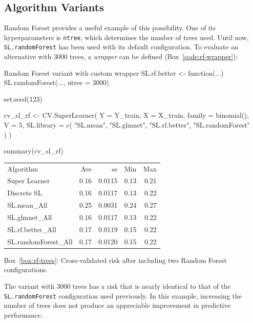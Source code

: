 \documentclass[12pt]{article}
\newcommand{\routputcaption}[2]{%
    \par\smallskip
    \begin{center}
        Box~\ref{#1}: #2
    \end{center}
}
\begin{document}
\subsection{Algorithm Variants}

Random Forest provides a useful example of this possibility. One of its hyperparameters is \texttt{ntree}, which determines the number of trees used. Until now, \texttt{SL.randomForest} has been used with its default configuration. To evaluate an alternative with 3000 trees, a \textit{wrapper} can be defined (Box~\ref{code:rf-wrapper}):

\begin{rcode}[label={code:rf-wrapper}]{Random Forest variant with custom wrapper}
	SL.rf.better <- function(...) {
		SL.randomForest(..., ntree = 3000)
	}
	
	set.seed(123)
	
	cv_sl_rf <- CV.SuperLearner(
	Y = Y_train, X = X_train,
	family = binomial(),
	V = 5,
	SL.library = c(
	"SL.mean",
	"SL.glmnet",
	"SL.rf.better",
	"SL.randomForest"
	)
	)
	
	summary(cv_sl_rf)
\end{rcode}

\begin{routputboxref}[label={box:rf-trees}]
	\ttfamily
	\centering
	\begin{tabular}{lrrrr}
		Algorithm & Ave & se & Min & Max \\
		Super Learner & 0.16 & 0.0115 & 0.13 & 0.21 \\
		Discrete SL & 0.16 & 0.0117 & 0.13 & 0.22 \\
		SL.mean\_All & 0.25 & 0.0031 & 0.24 & 0.27 \\
		SL.glmnet\_All & 0.16 & 0.0117 & 0.13 & 0.22 \\
		SL.rf.better\_All & 0.17 & 0.0119 & 0.15 & 0.22 \\
		SL.randomForest\_All & 0.17 & 0.0120 & 0.15 & 0.22 \\
	\end{tabular}
\end{routputboxref}

\routputcaption{box:rf-trees}
{Cross-validated risk after including two Random Forest configurations.}

The variant with 3000 trees has a risk that is nearly identical to that of the \texttt{SL.randomForest} configuration used previously. In this example, increasing the number of trees does not produce an appreciable improvement in predictive performance.
\end{document}
